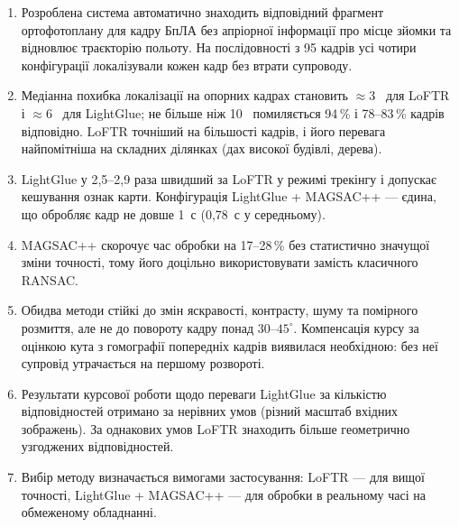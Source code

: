 \begin{enumerate}
    \item Розроблена система автоматично знаходить відповідний фрагмент ортофотоплану для кадру БпЛА без апріорної інформації про місце зйомки та відновлює траєкторію польоту. На послідовності з 95 кадрів усі чотири конфігурації локалізували кожен кадр без втрати супроводу.
    \item Медіанна похибка локалізації на опорних кадрах становить $\approx 3$~\px{} для LoFTR і $\approx 6$~\px{} для LightGlue; не більше ніж 10~\px{} помиляється 94\,\% і 78--83\,\% кадрів відповідно. LoFTR точніший на більшості кадрів, і його перевага найпомітніша на складних ділянках (дах високої будівлі, дерева).
    \item LightGlue у 2,5--2,9 раза швидший за LoFTR у режимі трекінгу і допускає кешування ознак карти. Конфігурація LightGlue + MAGSAC++ --- єдина, що обробляє кадр не довше 1~с (0,78~с у середньому).
    \item MAGSAC++ скорочує час обробки на 17--28\,\% без статистично значущої зміни точності, тому його доцільно використовувати замість класичного RANSAC.
    \item Обидва методи стійкі до змін яскравості, контрасту, шуму та помірного розмиття, але не до повороту кадру понад $30$--$45^\circ$. Компенсація курсу за оцінкою кута з гомографії попередніх кадрів виявилася необхідною: без неї супровід утрачається на першому розвороті.
    \item Результати курсової роботи щодо переваги LightGlue за кількістю відповідностей отримано за нерівних умов (різний масштаб вхідних зображень). За однакових умов LoFTR знаходить більше геометрично узгоджених відповідностей.
    \item Вибір методу визначається вимогами застосування: LoFTR --- для вищої точності, LightGlue + MAGSAC++ --- для обробки в реальному часі на обмеженому обладнанні.
\end{enumerate}
